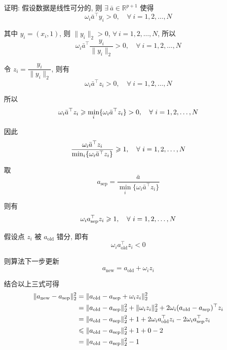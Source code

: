\documentclass{article}
\begin{document}
证明: 假设数据是线性可分的, 则 $\exists~\bar{a}\in\mathbb{R}^{p+1}$ 使得
\begin{equation}
  \omega_i\bar{a}^{\top}y_i>0,\quad \forall~i=1,2,\dots,N
\end{equation}

其中 $y_i=(x_i,1)$, 则 $\|y_i\|_2>0$, $\forall~i=1,2,\dots,N$, 所以
\begin{equation}
  \omega_i\bar{a}^{\top}\frac{y_i}{\|y_i\|_2}>0,\quad \forall~i=1,2,\dots,N
\end{equation}

令 $z_i=\dfrac{y_i}{\|y_i\|_2}$, 则有
\begin{equation}
  \omega_i\bar{a}^{\top}z_i>0,\quad \forall~i=1,2,\dots,N
\end{equation}

所以
\begin{equation}
  \omega_i\bar{a}^{\top}z_i\geqslant\min_{i}\{\omega_i\bar{a}^{\top}z_i\}>0,\quad \forall~i=1,2,\dots,N
\end{equation}

因此
\begin{equation}
  \frac{\omega_i\bar{a}^{\top}z_i}{\min_{i}\{\omega_i\bar{a}^{\top}z_i\}}\geqslant1,\quad \forall~i=1,2,\dots,N
\end{equation}

取
\begin{equation*}
  a_{\mathrm{sep}}=\frac{\bar{a}}{\min_{i}\{\omega_i\bar{a}^{\top}z_i\}}
\end{equation*}

则有
\begin{equation}
  \omega_ia_{\mathrm{sep}}^{\top}z_i\geqslant1,\quad \forall~i=1,2,\dots,N
\end{equation}

假设点 $z_i$ 被 $a_{\mathrm{old}}$ 错分, 即有
\begin{equation}
  \omega_ia_{\mathrm{old}}^{\top}z_i<0
\end{equation}

则算法下一步更新
\begin{equation}
  a_{\mathrm{new}} = a_{\mathrm{old}}+\omega_iz_i
\end{equation}

结合以上三式可得
\begin{equation}
  \begin{aligned}
    \|a_{\mathrm{new}}-a_{\mathrm{sep}}\|_2^2
    &=\|a_{\mathrm{old}}-a_{\mathrm{sep}}+\omega_iz_i\|_2^2\\
    &=\|a_{\mathrm{old}}-a_{\mathrm{sep}}\|_2^2+\|\omega_iz_i\|_2^2+2\omega_i(a_{\mathrm{old}}-a_{\mathrm{sep}})^{\top}z_i\\
    &=\|a_{\mathrm{old}}-a_{\mathrm{sep}}\|_2^2+1+2\omega_ia_{\mathrm{old}}^{\top}z_i-2\omega_ia_{\mathrm{sep}}^{\top}z_i\\
    &\leqslant\|a_{\mathrm{old}}-a_{\mathrm{sep}}\|_2^2+1+0-2\\
    &=\|a_{\mathrm{old}}-a_{\mathrm{sep}}\|_2^2-1
  \end{aligned}
\end{equation}
\end{document}
